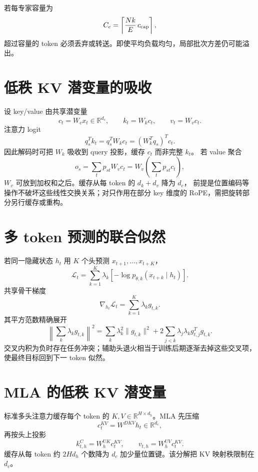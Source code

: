 \documentclass[11pt]{article}
\numberwithin{equation}{section}
\newcommand{\R}{\mathbb{R}}
\newcommand{\1}{\mathbf{1}}
\newcommand{\cL}{\mathcal{L}}
\begin{document}
若每专家容量为
\begin{equation}
 C_e=\left\lceil\frac{Nk}{E}\,c_{\rm cap}\right\rceil,
\end{equation}
超过容量的 token 必须丢弃或转送。即使平均负载均匀，局部批次方差仍可能溢出。

\section{低秩 KV 潜变量的吸收}

设 key/value 由共享潜变量
\begin{equation}
 c_t=W_cx_t\in\R^{d_c},\qquad
 k_t=W_kc_t,\qquad v_t=W_vc_t.
\end{equation}
注意力 logit
\begin{equation}
 q_s^Tk_t=q_s^TW_kc_t=(W_k^Tq_s)^Tc_t.
\end{equation}
因此解码时可把 $W_k$ 吸收到 query 投影，缓存 $c_t$ 而非完整 $k_t$。
若 value 聚合
\begin{equation}
 o_s=\sum_tp_{st}W_vc_t=W_v\left(\sum_tp_{st}c_t\right),
\end{equation}
$W_v$ 可放到加权和之后。缓存从每 token 的 $d_k+d_v$ 降为 $d_c$，
前提是位置编码等操作不破坏这些线性交换关系；对只作用在部分 key 维度的 RoPE，需把旋转部分另行缓存或重构。

\section{多 token 预测的联合似然}

若同一隐藏状态 $h_t$ 用 $K$ 个头预测 $x_{t+1},\ldots,x_{t+K}$，
\begin{equation}
 \cL_t=\sum_{k=1}^{K}\lambda_k
 [-\log p_{\theta,k}(x_{t+k}\mid h_t)].
\end{equation}
共享骨干梯度
\begin{equation}
 \nabla_{h_t}\cL_t=\sum_{k=1}^{K}\lambda_k g_{t,k}.
\end{equation}
其平方范数精确展开
\begin{equation}
 \left\|\sum_k\lambda_kg_{t,k}\right\|^2
 =\sum_k\lambda_k^2\|g_{t,k}\|^2
 +2\sum_{j<k}\lambda_j\lambda_k g_{t,j}^Tg_{t,k}.
\end{equation}
交叉内积为负时存在任务冲突；辅助头退火相当于训练后期逐渐去掉这些交叉项，
使最终目标回到下一 token 似然。

\section{MLA 的低秩 KV 潜变量}
标准多头注意力缓存每个 token 的 $K,V\in\R^{H\times d_h}$。MLA 先压缩
\begin{equation}
  c_t^{KV}=W^{DKV}h_t\in\R^{d_c},
\end{equation}
再按头上投影
\begin{equation}
  k_{t,h}^C=W_h^{UK}c_t^{KV},\qquad
  v_{t,h}=W_h^{UV}c_t^{KV}.
\end{equation}
缓存从每 token 约 $2Hd_h$ 个数降为 $d_c$ 加少量位置键。该分解把 KV 映射秩限制在 $d_c$。
\end{document}
